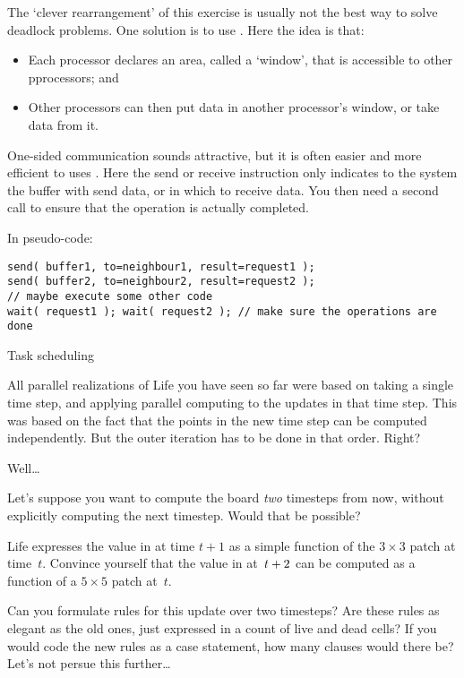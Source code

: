 The `clever rearrangement' of this exercise is usually not the best way to 
solve deadlock problems. One solution is to use .
Here the idea is that:
\begin{itemize}
\item Each processor declares an area, called a `window', that is accessible to other
  pprocessors; and
\item Other processors can then put data in another processor's window, or take data
  from it.
\end{itemize}
One-sided communication sounds attractive, but it is often easier and more efficient
to uses . Here the send or receive instruction
only indicates to the system the buffer with send data, or in which to receive data. 
You then need a second call to ensure that the operation is actually completed.

In pseudo-code:
\begin{verbatim}
send( buffer1, to=neighbour1, result=request1 );
send( buffer2, to=neighbour2, result=request2 );
// maybe execute some other code
wait( request1 ); wait( request2 ); // make sure the operations are done
\end{verbatim}

 {Task scheduling}
\label{sec:dag}

All parallel realizations of Life you have seen so far were based
on taking a single time step, and applying parallel computing to
the updates in that time step. This was based on the fact that
the points in the new time step can be computed independently.
But the outer iteration has to be done in that order. Right?

Well\ldots

Let's suppose you want to compute the board \emph{two} timesteps from
now, without explicitly computing the next timestep. Would that be possible?

\begin{exercise}
  Life expresses the value in  at time $t+1$ as a simple
  function of the $3\times3$ patch  at time~$t$.
  Convince yourself that the value in  at~$t+\nobreak2$ can be
  computed as a function of a $5\times5$ patch at~$t$.

  Can you formulate rules for this update over two timesteps? Are
  these rules as elegant as the old ones, just expressed in a count of
  live and dead cells? If you would code the new rules as a case
  statement, how many clauses would there be? Let's not persue this
  further\ldots
\end{exercise}

